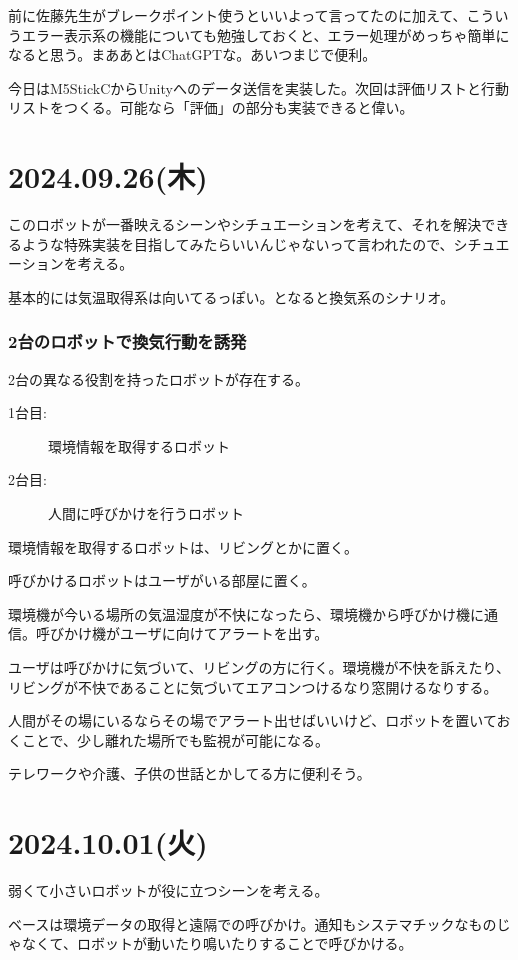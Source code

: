 \documentclass[twocolumn]{mynote}
\begin{document}
前に佐藤先生がブレークポイント使うといいよって言ってたのに加えて、こういうエラー表示系の機能についても勉強しておくと、エラー処理がめっちゃ簡単になると思う。まああとはChatGPTな。あいつまじで便利。

今日はM5StickCからUnityへのデータ送信を実装した。次回は評価リストと行動リストをつくる。可能なら「評価」の部分も実装できると偉い。

\section*{2024.09.26(木)}
このロボットが一番映えるシーンやシチュエーションを考えて、それを解決できるような特殊実装を目指してみたらいいんじゃないって言われたので、シチュエーションを考える。

基本的には気温取得系は向いてるっぽい。となると換気系のシナリオ。

\subsubsection*{2台のロボットで換気行動を誘発}
2台の異なる役割を持ったロボットが存在する。
\begin{description}
  \item[1台目:]環境情報を取得するロボット
  \item[2台目:]人間に呼びかけを行うロボット
\end{description}

環境情報を取得するロボットは、リビングとかに置く。

呼びかけるロボットはユーザがいる部屋に置く。

環境機が今いる場所の気温湿度が不快になったら、環境機から呼びかけ機に通信。呼びかけ機がユーザに向けてアラートを出す。

ユーザは呼びかけに気づいて、リビングの方に行く。環境機が不快を訴えたり、リビングが不快であることに気づいてエアコンつけるなり窓開けるなりする。

人間がその場にいるならその場でアラート出せばいいけど、ロボットを置いておくことで、少し離れた場所でも監視が可能になる。

テレワークや介護、子供の世話とかしてる方に便利そう。

\section*{2024.10.01(火)}
弱くて小さいロボットが役に立つシーンを考える。

ベースは環境データの取得と遠隔での呼びかけ。通知もシステマチックなものじゃなくて、ロボットが動いたり鳴いたりすることで呼びかける。
\end{document}
